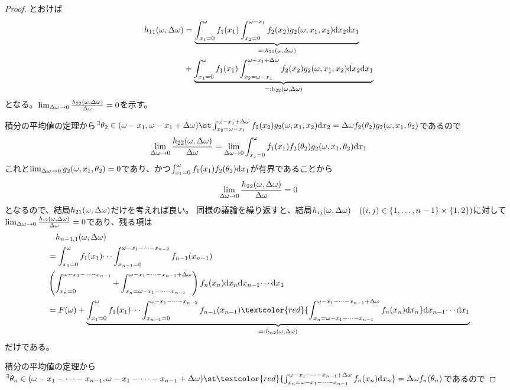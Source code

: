 \begin{proof}
            とおけば
            \begin{align*}
                h_{11}(\omega,{\Delta\omega}) &= \underbrace{\int_{x_1=0}^\omega f_1(x_1)\int_{x_2=0}^{\omega-x_1}f_2(x_2)g_2(\omega,x_1,x_2){\mathrm{d}x_2}{\mathrm{d}x_1}}_{=:h_{21}(\omega,{\Delta\omega})} \\
                &+ \underbrace{\int_{x_1=0}^\omega f_1(x_1)\int_{x_2=\omega-x_1}^{\omega-x_1+{\Delta\omega}}f_2(x_2)g_2(\omega,x_1,x_2){\mathrm{d}x_2}{\mathrm{d}x_1}}_{=:h_{22}(\omega,{\Delta\omega})}
            \end{align*}
            となる。$\lim_{{\Delta\omega}\to 0}\frac{h_{22}(\omega,{\Delta\omega})}{{\Delta\omega}} = 0$を示す。
            \par
            積分の平均値の定理から$^\exists\theta_2\in(\omega-x_1,\omega-x_1+\domega)\st\int_{x_2=\omega-x_1}^{\omega-x_1+\domega}f_2(x_2)g_2(\omega,x_1,x_2)\d{x_2} = \domega f_2(\theta_2)g_2(\omega,x_1,\theta_2)$であるので
            \[\lim_{{\Delta\omega}\to 0}\frac{h_{22}(\omega,{\Delta\omega})}{{\Delta\omega}} = \lim_{{\Delta\omega}\to 0}\int_{x_1=0}^\omega f_1(x_1)f_2(\theta_2)g_2(\omega,x_1,\theta_2){\mathrm{d}x_1}\]
            これと$\lim_{{\Delta\omega}\to 0}g_2(\omega,x_1,\theta_2)=0$であり、かつ$\int_{x_1=0}^\omega f_1(x_1)f_2(\theta_2){\mathrm{d}x_1}$が有界であることから
            \[\lim_{{\Delta\omega}\to 0}\frac{h_{22}(\omega,{\Delta\omega})}{{\Delta\omega}} = 0\]
            となるので、結局$h_{21}(\omega,{\Delta\omega})$だけを考えれば良い。
            同様の議論を繰り返すと、結局$h_{ij}(\omega,{\Delta\omega})\quad((i,j)\in\{1,\dotsc,n-1\}\times\{1,2\})$に対して$\lim_{{\Delta\omega}\to 0}\frac{h_{i2}(\omega,{\Delta\omega})}{{\Delta\omega}}=0$であり、残る項は
            \begin{align*}
                &\quad h_{n-1,1}(\omega,\domega) \\
                &= \int_{x_1=0}^{\omega}f_1(x_1)\dotsi\int_{x_{n-1}=0}^{\omega-x_1-\dotsb-x_{n-2}}f_{n-1}(x_{n-1}) \\
                & \left(\int_{x_n=0}^{\omega-x_1-\dotsb-x_{n-1}}+\int_{x_n=\omega-x_1-\dotsb-x_{n-1}}^{\omega-x_1-\dotsb-x_{n-1}+\domega}\right)f_n(x_n)\d{x_n}\d{x_{n-1}}\dotsi\d{x_1} \\
                &= F(\omega) + \underbrace{\int_{x_1=0}^{\omega}f_1(x_1)\dotsi\int_{x_{n-1}=0}^{\omega-x_1-\dotsb-x_{n-2}}f_{n-1}(x_{n-1})\textcolor{red}{\int_{x_n=\omega-x_1-\dotsb-x_{n-1}}^{\omega-x_1-\dotsb-x_{n-1}+\domega}f_n(x_n)\d{x_n}}\d{x_{n-1}}\dotsi\d{x_1}}_{=:h_{n2}(\omega,\domega)}
            \end{align*}
            だけである。
            \par
            積分の平均値の定理から$^\exists\theta_n\in(\omega-x_1-\dotsb-x_{n-1},\omega-x_1-\dotsb-x_{n-1}+\domega)\st\textcolor{red}{\int_{x_n=\omega-x_1-\dotsb-x_{n-1}}^{\omega-x_1-\dotsb-x_{n-1}+\domega}f_n(x_n)\d{x_n}} = \domega f_n(\theta_n)$であるので

\end{proof}
